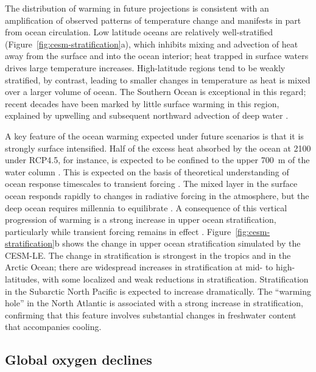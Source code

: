 \documentclass[draft,linenumbers]{report_chapter}
\begin{document}
The distribution of warming in future projections is consistent with an amplification of observed patterns of temperature change \citep{Levitus-Antonov-etal-2012} and manifests in part from ocean circulation.
Low latitude oceans are relatively well-stratified (Figure~\ref{fig:cesm-stratification}a), which inhibits mixing and advection of heat away from the surface and into the ocean interior; heat trapped in surface waters drives large temperature increases.
High-latitude regions tend to be weakly stratified, by contrast, leading to smaller changes in temperature as heat is mixed over a larger volume of ocean.
The Southern Ocean is exceptional in this regard; recent decades have been marked by little surface warming in this region, explained by upwelling and subsequent northward advection of deep water \citep{Armour-Marshall-etal-2016}.

A key feature of the ocean warming expected under future scenarios is that it is strongly surface intensified.
Half of the excess heat absorbed by the ocean at 2100 under RCP4.5, for instance, is expected to be confined to the upper 700~m of the water column \citep{Collins-Knutti-etal-2013}.
This is expected on the basis of theoretical understanding of ocean response timescales to transient forcing \citep{Held-Winton-etal-2010,Stouffer-2004}.
The mixed layer in the surface ocean responds rapidly to changes in radiative forcing in the atmosphere, but the deep ocean requires millennia to equilibrate \citep{Hansen-Sato-etal-2011,Li-Storch-etal-2013}.
A consequence of this vertical progression of warming is a strong increase in upper ocean stratification, particularly while transient forcing remains in effect \citep{Xu-Xie-etal-2012,Xu-Xie-etal-2013}.
Figure~\ref{fig:cesm-stratification}b shows the change in upper ocean stratification simulated by the CESM-LE.
The change in stratification is strongest in the tropics and in the Arctic Ocean; there are widespread increases in stratification at mid- to high-latitudes, with some localized and weak reductions in stratification.
Stratification in the Subarctic North Pacific is expected to increase dramatically.
The ``warming hole'' in the North Atlantic is associated with a strong increase in stratification, confirming that this feature involves substantial changes in freshwater content that accompanies cooling.

\subsection{Global oxygen declines}
\end{document}
